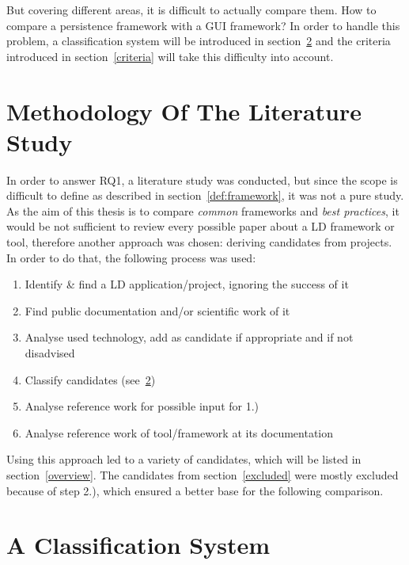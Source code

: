 But covering different areas, it is difficult to actually compare them. How to compare a persistence framework with a GUI framework? In order to handle this problem, a classification system will be introduced in section~\ref{classification} and the criteria introduced in section~\ref{criteria} will take this difficulty into account.

\section{Methodology Of The Literature Study}\label{meth_study}
In order to answer RQ1, a literature study was conducted, but since the scope is difficult to define as described in section~\ref{def:framework}, it was not a pure study. As the aim of this thesis is to compare \textit{common} frameworks and \textit{best practices}, it would be not sufficient to review every possible paper about a LD framework or tool, therefore another approach was chosen: deriving candidates from projects. In order to do that, the following process was used:

\begin{enumerate}
\item Identify \& find a LD application/project, ignoring the success of it
\item Find public documentation and/or scientific work of it
\item Analyse used technology, add as candidate if appropriate and if not disadvised
\item Classify candidates (see~\ref{classification})
\item Analyse reference work for possible input for 1.)
\item Analyse reference work of tool/framework at its documentation
\end{enumerate}

Using this approach led to a variety of candidates, which will be listed in section~\ref{overview}. The candidates from section~\ref{excluded} were mostly excluded because of step 2.), which ensured a better base for the following comparison.

\section{A Classification System}\label{classification}

